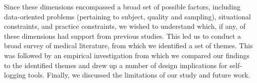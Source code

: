 \documentclass{sigchi}
\begin{document}


Since these dimensions encompassed a broad set of possible factors, including data-oriented problems (pertaining to subject, quality and sampling), situational constraints, and practice constraints, we wished to understand which, if any, of these dimensions had support from previous studies.  This led us to conduct a broad survey of medical literature, from which we identified a set of themes. This was followed by an empirical investigation from which we compared our findings to the identified themes and drew up a number of design implications for self-logging tools.  Finally, we discussed the limitations of our study and future work.




\end{document}

